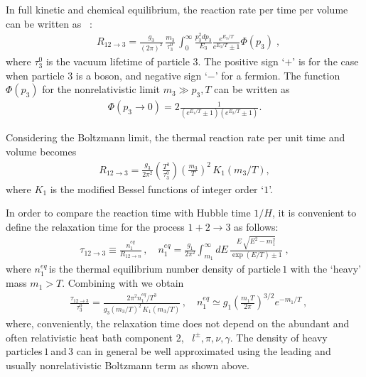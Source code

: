 In full kinetic and chemical equilibrium, the reaction rate per time per volume can be written as~\cite{Kuznetsova:2010pi} :
\begin{align}
&R_{12\to 3}=\frac{g_3}{(2\pi)^2}\,\frac{m_3}{\tau^0_3}\,\int^\infty_0\frac{p^2_3dp_3}{E_3}\frac{e^{E_3/T}}{e^{E_3/T}\pm1}\Phi(p_3)\;,
\end{align}
where $\tau^0_3$ is the vacuum lifetime of particle $3$. The positive sign `$+$' is for the case when particle $3$ is a boson, and negative sign `$-$' for a fermion. The function $\Phi(p_3)$ for the nonrelativistic limit $m_3\gg p_3,T$ can be written as 
\begin{align}
\Phi(p_3\to0)=2\frac{1}{(e^{E_1/T}\pm1)(e^{E_2/T}\pm1)}.
\end{align}

Considering the Boltzmann limit, the thermal reaction rate per unit time and volume becomes
\begin{align}
\label{Thermal_Rate}
R_{12\rightarrow3}=\frac{g_3}{2\pi^2}\left(\frac{T^3}{\tau^0_3}\right)\left(\frac{m_3}{T}\right)^2\,K_1(m_3/T),
\end{align}
where $K_1$ is the modified Bessel functions of integer order `$1$'. 

In order to compare the reaction time with Hubble time $1/H$, it is convenient to define the relaxation time for the process $1+2\rightarrow 3$ as follows:
\begin{align}
\label{Reaction_Time}
\tau_{12\rightarrow 3}\equiv\frac{n^{eq}_{1}}{R_{12\rightarrow n}}\,,\quad
n^{eq}_1=\frac{g_1}{2\pi^2}\int_{m_1}^\infty\!\!\!\!dE\,\frac{E\,\sqrt{E^2-m_1^2}}{\exp{\left(E/T\right)}\pm1}\;, 
\end{align}
where $n^{eq}_1$\,is the thermal equilibrium number density of particle\,$1$ with the `heavy' mass $m_1>T$. Combining  with  we obtain
\begin{align}\label{RelaxationTime}
&\frac{\tau_{12\rightarrow3}}{ \tau^0_3}= 
\frac{2\pi^2 n^{eq}_1/T^3}{g_3(m_3/T)^2\,K_1(m_3/T)}\,, \quad 
n^{eq}_1\simeq g_1\left(\frac{m_1 T}{2\pi}\right)^{3/2}e^{-m_1/T}\,,
\end{align}
where, conveniently, the relaxation time does not depend on the abundant and often relativistic heat bath component $2$, \eg\ $l^\pm,\pi,\nu,\gamma$. The density of heavy particles\,$1$\,and\,$3$ can in general be well approximated using the leading and usually nonrelativistic Boltzmann term as shown above.

